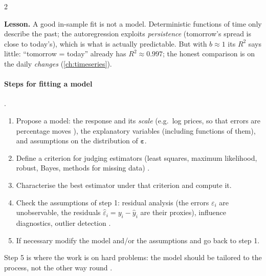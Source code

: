 \begin{paracol}{2}
\begin{solution}
\textbf{Lesson.} A good in-sample fit is not a model. Deterministic functions of time only describe the
past; the autoregression exploits \emph{persistence} (tomorrow's spread is close to today's), which is
what is actually predictable. But with $b\approx1$ its $R^2$ says little: ``tomorrow = today'' already has
$R^2\approx0.997$; the honest comparison is on the daily \emph{changes} (\cref{ch:timeseries}).
\end{solution}

\paragraph{Steps for fitting a model}  .
\begin{enumerate}[1.]
  \item Propose a model: the response and its \emph{scale} (e.g.\ log prices, so that errors are
        percentage moves ), the explanatory variables (including functions of them), and
        assumptions on the distribution of $\bm\varepsilon$.
  \item Define a criterion for judging estimators (least squares, maximum likelihood, robust, Bayes,
        methods for missing data) .
  \item Characterise the best estimator under that criterion and compute it.
  \item Check the assumptions of step 1: residual analysis (the errors $\varepsilon_i$ are unobservable, the
        residuals $\hat\varepsilon_i=y_i-\hat y_i$ are their proxies), influence diagnostics, outlier detection
        .
  \item If necessary modify the model and/or the assumptions and go back to step 1.
\end{enumerate}
Step 5 is where the work is on hard problems: the model should be tailored to the process, not the
other way round .


\end{paracol}
